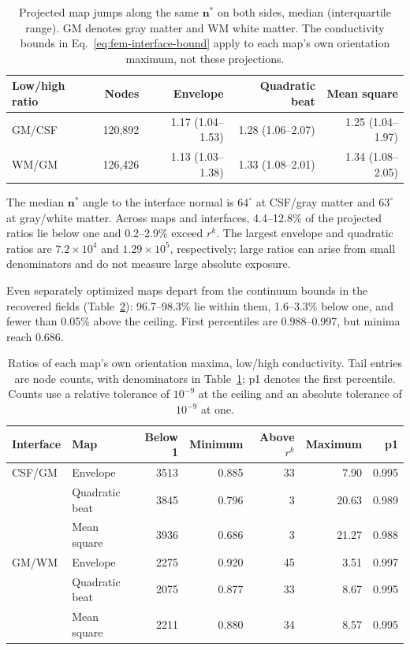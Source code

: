 \documentclass[11pt,a4paper]{article}
\providecommand{\DIFaddtex}[1]{{\protect\color{blue} \sf #1}} %
\providecommand{\DIFadd}[1]{\texorpdfstring{\DIFaddtex{#1}}{#1}} %
\begin{document}
\begin{table}[htbp]
\color{blue}
\centering\small
\begin{tabular}{@{}lrrrr@{}}
\toprule
Low/high ratio & Nodes & Envelope & Quadratic beat & Mean square\\
\midrule
GM/CSF & 120,892 & 1.17 (1.04--1.53) & 1.28 (1.06--2.07) & 1.25 (1.04--1.97)\\
WM/GM & 126,426 & 1.13 (1.03--1.38) & 1.33 (1.08--2.01) & 1.34 (1.08--2.05)\\
\bottomrule
\end{tabular}
\caption{\color{blue}Projected map jumps along the same $\mathbf n^*$ on both sides,
median (interquartile range). GM denotes gray matter and WM white matter.
The conductivity bounds in Eq.~\eqref{eq:fem-interface-bound} apply to
each map's own orientation maximum, not these projections.}
\label{tab:fem-interface-jumps}
\end{table}

\DIFadd{The median $\mathbf n^*$ angle to the interface normal is $64^\circ$ at
CSF/gray matter and $63^\circ$ at gray/white matter. Across maps and interfaces,
4.4--12.8\% of the projected ratios lie below one and 0.2--2.9\% exceed
$r^k$. The largest envelope and quadratic ratios are $7.2\times10^4$ and
$1.29\times10^5$, respectively; large ratios can arise from small denominators
and do not measure large absolute exposure.
}

\DIFadd{Even separately optimized maps depart from the continuum bounds in the
recovered fields (Table~\ref{tab:fem-interface-tails}): 96.7--98.3\% lie
within them, 1.6--3.3\% below one, and fewer than 0.05\% above the ceiling.
First percentiles are 0.988--0.997, but minima reach 0.686.
}

\begin{table}[htbp]
\color{blue}
\centering\small
\begin{tabular}{@{}llrrrrr@{}}
\toprule
Interface & Map & Below 1 & Minimum & Above $r^k$ & Maximum & p1\\
\midrule
CSF/GM & Envelope & 3513 & 0.885 & 33 & 7.90 & 0.995\\
 & Quadratic beat & 3845 & 0.796 & 3 & 20.63 & 0.989\\
 & Mean square & 3936 & 0.686 & 3 & 21.27 & 0.988\\
GM/WM & Envelope & 2275 & 0.920 & 45 & 3.51 & 0.997\\
 & Quadratic beat & 2075 & 0.877 & 33 & 8.67 & 0.995\\
 & Mean square & 2211 & 0.880 & 34 & 8.57 & 0.995\\
\bottomrule
\end{tabular}
\caption{\color{blue}Ratios of each map's own orientation maxima, low/high conductivity.
Tail entries are node counts, with denominators in Table~\ref{tab:fem-interface-jumps};
p1 denotes the first percentile. Counts use a relative tolerance of $10^{-9}$
at the ceiling and an absolute tolerance of $10^{-9}$ at one.}
\label{tab:fem-interface-tails}
\end{table}
\end{document}
